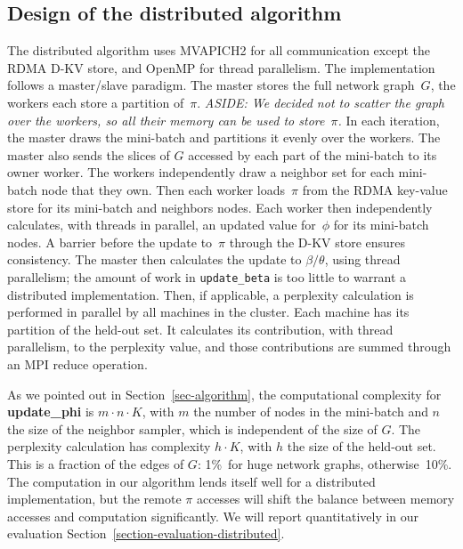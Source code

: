 \subsection{Design of the distributed algorithm}

The distributed algorithm uses MVAPICH2\cite{mvapich2} for all communication
except the RDMA D-KV store, and OpenMP\cite{openmp} for thread parallelism. The
implementation follows a master/slave paradigm. The master stores the full
network graph~$G$, the workers each store a partition of~$\pi$. \textit{ASIDE:
We decided not to scatter the graph over the workers, so all their memory can
be used to store~$\pi$.} In each iteration, the master draws the mini-batch
and partitions it evenly over the workers. The master also sends the slices
of $G$ accessed by each part of the mini-batch to its owner worker. The
workers independently draw a neighbor set for each mini-batch node that they
own. Then each worker loads~$\pi$ from the RDMA key-value store for its
mini-batch and neighbors nodes. Each worker then independently calculates,
with threads in parallel, an updated value for~$\phi$ for its mini-batch
nodes.  A barrier before the update to~$\pi$ through the D-KV store ensures
consistency. The master then calculates the update to $\beta/\theta$,
using thread parallelism; the amount of work in \texttt{update\_beta} is
too little to warrant a distributed implementation. Then, if applicable,
a perplexity calculation is performed in parallel by all machines in the
cluster. Each machine has its partition of the held-out set. It calculates
its contribution, with thread parallelism, to the perplexity value, and those
contributions are summed through an MPI reduce operation.

As we pointed out in Section~\ref{sec-algorithm}, the computational complexity for
\textbf{update\_phi} is $m \cdot n \cdot K$, with $m$ the number of nodes in the
mini-batch and $n$ the size of the neighbor sampler, which is independent of the size
of $G$. The perplexity calculation has complexity $h \cdot K$, with $h$ the size of
the held-out set. This is a fraction of the edges of $G$: 1\%~for huge network graphs,
otherwise~10\%.
The computation in our algorithm lends itself well for a distributed
implementation, but the remote $\pi$ accesses will shift the balance between
memory accesses and computation significantly. We will report quantitatively
in our evaluation Section~\ref{section-evaluation-distributed}.
